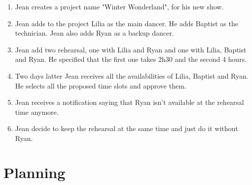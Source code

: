\documentclass[11pt]{article}
\begin{document}
\begin{enumerate}
    \item Jean creates a project name "Winter Wonderland", for his new show.
    \item Jean adds to the project Lilia as the main dancer. He adds Baptist as the technician. Jean also adds Ryan as a backup dancer.
    \item Jean add two rehearsal, one with Lilia and Ryan and one with Lilia, Baptist and Ryan. He specified that the first one takes 2h30 and the second 4 hours.
    \item Two days latter Jean receives all the availabilities of Lilia, Baptist and Ryan. He selects all the proposed time slots and approve them.
    \item Jean receives a notification saying that Ryan isn't available at the rehearsal time anymore.
    \item Jean decide to keep the rehearsal at the same time and just do it without Ryan.
\end{enumerate}

\newpage
\section{Planning}
\end{document}
